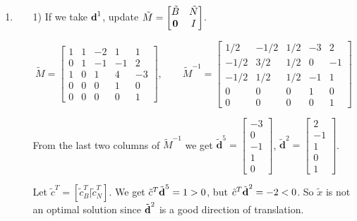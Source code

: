 \documentclass[12pt]{article}
\begin{document}
\begin{enumerate}[label = (\alph*)]
\begin{enumerate}
\end{enumerate}

\item

\begin{enumerate}
\item[1)] If we take $\textbf d^1$, update $\tilde{M} = \begin{bmatrix}
\tilde B & \tilde N \\
\textbf 0 & I
\end{bmatrix}$.

$$
\tilde M = \begin{bmatrix}
     1   &  1  &  -2  &   1  &   1\\
     0  &   1   & -1  &  -1  &   2\\
     1   &  0  &   1   &  4  &  -3\\
     0   &  0  &   0   &  1   &  0\\
     0   &  0   &  0  &   0   &  1
\end{bmatrix}, \qquad 
\tilde M^{-1} = \begin{bmatrix}
     1/2   &  -1/2  &  1/2  &   -3  &  2\\
     -1/2  &   3/2   & 1/2  &  0  &   -1 \\
     -1/2   &  1/2  &   1/2   &  -1  &  1 \\
     0   &  0  &   0   &  1   &  0\\
     0   &  0   &  0  &   0   &  1
\end{bmatrix}
$$

From the last two columns of $\tilde M^{-1}$ we get $\tilde {\textbf{d}}^5 = \begin{bmatrix}
-3 \\ 0 \\ -1 \\ 1 \\ 0
\end{bmatrix}$, $\tilde {\textbf{d}}^2 = \begin{bmatrix}
2 \\ -1 \\ 1 \\ 0 \\ 1
\end{bmatrix}$.

Let $\tilde c^T = [\tilde c_B^T | \tilde c_N^T]$. We get $\tilde c^T\tilde{\textbf d}^5 = 1 > 0$, but $\tilde c^T\tilde{\textbf d}^2 = -2 < 0$. So $\tilde x$ is not an optimal solution since $\tilde{\textbf d}^2$ is a good direction of translation.




\end{enumerate}
\end{enumerate}
\end{document}
